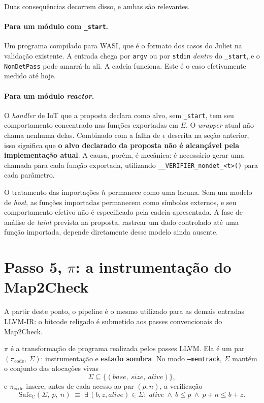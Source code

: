 \documentclass[11pt,a4paper]{article}
\theoremstyle{definition}
\newcommand{\Safe}{\mathrm{Safe}}
\newcommand{\code}[1]{\texttt{#1}}
\begin{document}
Duas consequências decorrem
disso, e ambas são relevantes.

\paragraph{Para um módulo com \code{\_start}.}
Um programa compilado para WASI, que é o formato dos casos do Juliet na validação
existente. A entrada chega por \code{argv} ou por \code{stdin} \emph{dentro} do
\code{\_start}, e o \code{NonDetPass} pode amarrá-la ali. A cadeia funciona. Este
é o caso efetivamente medido até hoje.

\paragraph{Para um módulo \emph{reactor}.}
O
\emph{handler} de IoT que a proposta declara como alvo, sem \code{\_start}, tem
seu comportamento concentrado nas funções exportadas em $E$. O \emph{wrapper}
atual não chama nenhuma delas. Combinado com a falha de $\epsilon$ descrita na
seção anterior, isso significa que \textbf{o alvo declarado da proposta não é
alcançável pela implementação atual}. A causa, porém, é mecânica: é necessário
gerar uma chamada para cada função exportada, utilizando
\code{\_\_VERIFIER\_nondet\_<t>()} para cada parâmetro.

O
tratamento das importações $h$ permanece como uma lacuna. Sem um modelo de
\emph{host}, as funções importadas permanecem como símbolos externos, e seu
comportamento efetivo não é especificado pela cadeia apresentada. A fase de
análise de \emph{taint} prevista na proposta, rastrear um dado controlado
até uma função importada, depende diretamente desse modelo ainda ausente.

\section{Passo 5, $\pi$: a instrumentação do Map2Check}
\label{sec:pi}

A partir deste ponto, o pipeline é o mesmo utilizado
para as demais entradas LLVM-IR: o bitcode religado é submetido aos passes
convencionais do Map2Check.

$\pi$ é a transformação de programa realizada pelos passes LLVM. Ela é um par
$(\pi_{\text{code}},\ \Sigma)$: instrumentação e \textbf{estado sombra}. No modo
\code{--memtrack}, $\Sigma$ mantém o conjunto das alocações vivas
\[
  \Sigma \subseteq
  \bigl\{ (\mathit{base},\ \mathit{size},\ \mathit{alive}) \bigr\},
\]
e $\pi_{\text{code}}$ insere, antes de cada acesso ao par $(p,n)$, a verificação
\[
  \Safe_{\mathrm{C}}(\Sigma,\ p,\ n) \;\equiv\;
  \exists\, (b,z,\mathit{alive}) \in \Sigma :\;
  \mathit{alive} \ \wedge\ b \le p \ \wedge\ p + n \le b + z .
\]
\end{document}
